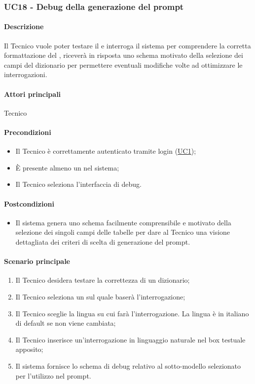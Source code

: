 \subsubsection{UC18 - Debug della generazione del prompt}\label{UC18}
\paragraph*{Descrizione}
Il Tecnico vuole poter testare il  e interroga il sistema per comprendere la corretta formattazione del , riceverà in risposta uno schema motivato della selezione dei campi del dizionario per permettere eventuali modifiche volte ad ottimizzare le interrogazioni.

\paragraph*{Attori principali}
Tecnico

\paragraph*{Precondizioni}
\begin{itemize}
  \item Il Tecnico è correttamente autenticato tramite login (\hyperref[UC1]{UC1});
  \item È presente almeno un  nel sistema;
  \item Il Tecnico seleziona l’interfaccia di debug.
\end{itemize}

\paragraph*{Postcondizioni}
\begin{itemize}
  \item Il sistema genera uno schema facilmente comprensibile e motivato della selezione dei singoli campi delle tabelle per dare al Tecnico una visione dettagliata dei criteri di scelta di generazione del prompt.
\end{itemize}

\paragraph*{Scenario principale}
\begin{enumerate}
  \item Il Tecnico desidera testare la correttezza di un dizionario;
  \item Il Tecnico seleziona un  sul quale baserà l’interrogazione;
  \item Il Tecnico sceglie la lingua su cui farà l’interrogazione. La lingua è in italiano di default se non viene cambiata;
  \item Il Tecnico inserisce un’interrogazione in linguaggio naturale nel box testuale apposito;
  \item Il sistema fornisce lo schema di debug relativo al sotto-modello selezionato per l’utilizzo nel prompt.
\end{enumerate}

